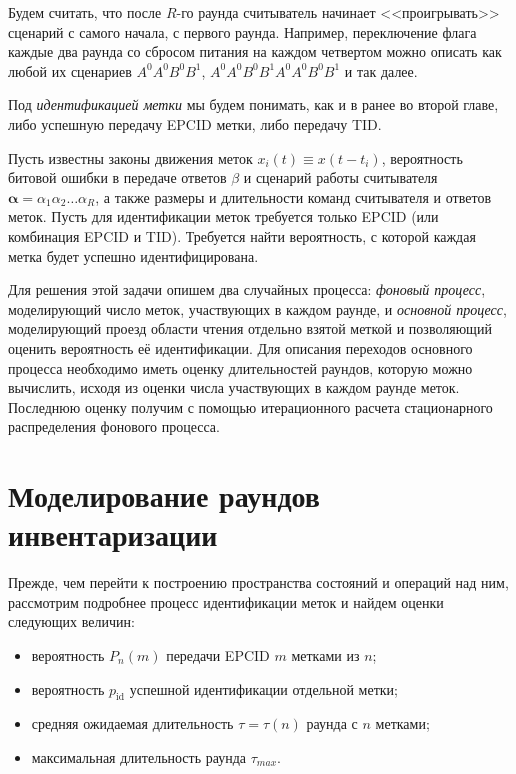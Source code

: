 Будем считать, что после $R$-го раунда считыватель начинает <<проигрывать>> сценарий с самого начала, с первого раунда. Например, переключение флага каждые два раунда со сбросом питания на каждом четвертом можно описать как любой их сценариев $A^0 A^0 B^0 B^1$, $A^0 A^0 B^0 B^1 A^0 A^0 B^0 B^1$ и так далее.

Под \textit{идентификацией метки} мы будем понимать, как и в ранее во второй главе, либо успешную передачу EPCID метки, либо передачу TID.


\begin{probl}\label{problem:ch3_id_prob}
	Пусть известны законы движения меток $x_i(t) \equiv x(t - t_i)$, вероятность битовой ошибки в передаче ответов $\beta$ и сценарий работы считывателя $\bm{\alpha} = \alpha_1 \alpha_2 \dots \alpha_R$, а также размеры и длительности команд считывателя и ответов меток. Пусть для идентификации меток требуется только EPCID (или комбинация EPCID и TID). Требуется найти вероятность, с которой каждая метка будет успешно идентифицирована.
\end{probl}

Для решения этой задачи опишем два случайных процесса: \textit{фоновый процесс}, моделирующий число меток, участвующих в каждом раунде, и \textit{основной процесс}, моделирующий проезд области чтения отдельно взятой меткой и позволяющий оценить вероятность её идентификации. Для описания переходов основного процесса необходимо иметь оценку длительностей раундов, которую можно вычислить, исходя из оценки числа участвующих в каждом раунде меток. Последнюю оценку получим с помощью итерационного расчета стационарного распределения фонового процесса.


\section{Моделирование раундов инвентаризации}\label{sec:ch3_inventory}
Прежде, чем перейти к построению пространства состояний и операций над ним, рассмотрим подробнее процесс идентификации меток и найдем оценки следующих величин:

\begin{itemize}
	\item вероятность $P_n(m)$ передачи EPCID $m$ метками из $n$;
	\item вероятность $p_\text{id}$ успешной идентификации отдельной метки;
	\item средняя ожидаемая длительность $\tau = \tau(n)$ раунда с $n$ метками;
	\item максимальная длительность раунда $\tau_{max}$.
\end{itemize}

